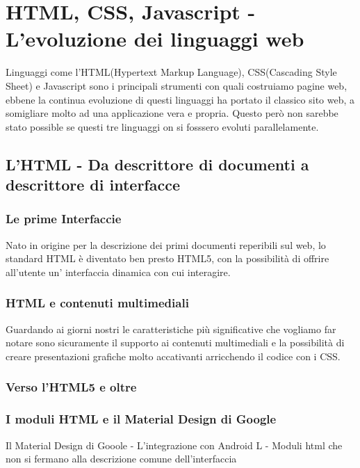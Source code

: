 
\chapter{HTML, CSS, Javascript - L'evoluzione dei linguaggi web} %

\label{ChapterX} %


Linguaggi come l'HTML(Hypertext Markup Language), CSS(Cascading Style Sheet) e Javascript sono i principali strumenti con quali costruiamo pagine web, ebbene la continua evoluzione di questi linguaggi ha portato il classico sito web, a somigliare molto ad una applicazione vera e propria. 
Questo però non sarebbe stato possible se  questi tre linguaggi on si fosssero evoluti parallelamente.
\section{L'HTML - Da descrittore di documenti a descrittore di interfacce}
\subsection{Le prime Interfaccie}
Nato in origine per la descrizione dei primi documenti reperibili sul web, lo standard HTML è diventato ben presto HTML5, con la possibilità di offrire all'utente un' interfaccia dinamica con cui interagire.
\subsection{HTML e contenuti multimediali}
Guardando ai giorni nostri le caratteristiche più significative che vogliamo far notare sono sicuramente il supporto ai contenuti multimediali e la possibilità di creare presentazioni grafiche molto accativanti
arricchendo il codice con i CSS.
\subsection{Verso l'HTML5 e oltre}

\subsection{I moduli HTML e il Material Design di Google}
Il Material Design di Gooole - L'integrazione con Android L - Moduli html che non si fermano alla descrizione comune dell'interfaccia

